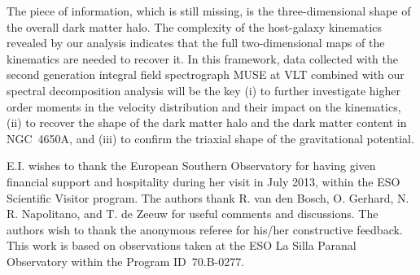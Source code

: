 \documentclass{aa}
\begin{document}
The piece of information, which is still missing, is the
three-dimensional shape of the overall dark matter halo. The
complexity of the host-galaxy kinematics revealed by our analysis
indicates that the full two-dimensional maps of the kinematics are
needed to recover it. In this framework, data collected with the
second generation integral field spectrograph MUSE at VLT
\citep{Bacon+2010} combined with our spectral decomposition analysis
will be the key (i) to further investigate higher order moments
  in the velocity distribution and their impact on the kinematics,
(ii) to recover the shape of the dark matter halo and the dark matter
content in NGC~4650A, and (iii) to confirm the triaxial shape of the
gravitational potential.


\begin{acknowledgements}
  E.I. wishes to thank the European Southern Observatory for having
  given financial support and hospitality during her visit in July
  2013, within the ESO Scientific Visitor program. The authors thank
  R. van den Bosch, O. Gerhard, N. R. Napolitano, and T. de Zeeuw for
  useful comments and discussions. The authors wish to thank the
  anonymous referee for his/her constructive feedback. This work is
  based on observations taken at the ESO La Silla Paranal Observatory
  within the Program ID~70.B-0277.
\end{acknowledgements}


\end{document}
